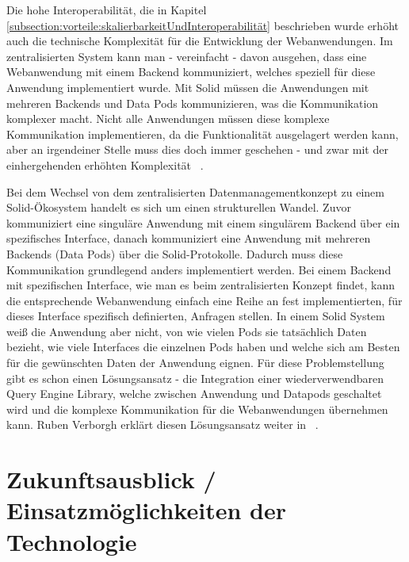 \documentclass[acmtog]{acmart}
\begin{document}
Die hohe Interoperabilität, die in Kapitel \ref{subsection:vorteile:skalierbarkeitUndInteroperabilität} beschrieben wurde erhöht auch die technische Komplexität für die Entwicklung der Webanwendungen. Im zentralisierten System kann man - vereinfacht - davon ausgehen, dass eine Webanwendung mit einem Backend kommuniziert, welches speziell für diese Anwendung implementiert wurde. Mit Solid müssen die Anwendungen mit mehreren Backends und Data Pods kommunizieren, was die Kommunikation komplexer macht. Nicht alle Anwendungen müssen diese komplexe Kommunikation implementieren, da die Funktionalität ausgelagert werden kann, aber an irgendeiner Stelle muss dies doch immer geschehen - und zwar mit der einhergehenden erhöhten Komplexität ~\cite{MarcoNeumann.2021}.

Bei dem Wechsel von dem zentralisierten Datenmanagementkonzept zu einem Solid-Ökosystem handelt es sich um einen strukturellen Wandel. Zuvor kommuniziert eine singuläre Anwendung mit einem singulärem Backend über ein spezifisches Interface, danach kommuniziert eine Anwendung mit mehreren Backends (Data Pods) über die Solid-Protokolle. Dadurch muss diese Kommunikation grundlegend anders implementiert werden. Bei einem Backend mit spezifischen Interface, wie man es beim zentralisierten Konzept findet, kann die entsprechende Webanwendung einfach eine Reihe an fest implementierten, für dieses Interface spezifisch definierten, Anfragen stellen. In einem Solid System weiß die Anwendung aber nicht, von wie vielen Pods sie tatsächlich Daten bezieht, wie viele Interfaces die einzelnen Pods haben und welche sich am Besten für die gewünschten Daten der Anwendung eignen. Für diese Problemstellung gibt es schon einen Lösungsansatz - die Integration einer wiederverwendbaren Query Engine Library, welche zwischen Anwendung und Datapods geschaltet wird und die komplexe Kommunikation für die Webanwendungen übernehmen kann. Ruben Verborgh erklärt diesen Lösungsansatz weiter in  ~\cite{MarcoNeumann.2021}.

\label{section:zukunftsausblick}
\section{Zukunftsausblick / Einsatzmöglichkeiten der Technologie}
\end{document}
